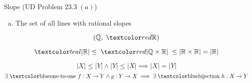 % 
% 

\begin{frame}{}
  \begin{exampleblock}{Slope (UD Problem $23.3 \;(a)$)}
    \begin{enumerate}[(a)]
      \item The set of all lines with rational slopes
    \end{enumerate}
  \end{exampleblock}

  \pause
  \[
    (\Q, \;\red{\R})
  \]

  \pause
  \[
    \teal{|\R| \le \;\red{|\Q \times \R|}\; \le |\R \times \R| = |\R|}
  \]
\end{frame}

\begin{frame}{}
  \begin{center}
    {\large {}}
  \end{center}

  \pause
  \vspace{0.30cm}
  \begin{theorem}
    \[
      |X| \le |Y| \land |Y| \le |X| \implies |X| = |Y|
    \]
    \pause
    \[
      \exists\; \text{\blue{one-to-one} } f: X \to Y \land g: Y \to X \implies \exists\; \text{\blue{bijection} } h: X \to Y
    \]
  \end{theorem}

  \pause
  \begin{columns}
      \pause
      \pause
      \vspace{-0.60cm}
      \begin{center}
	{}
      \end{center}
  \end{columns}
\end{frame}

